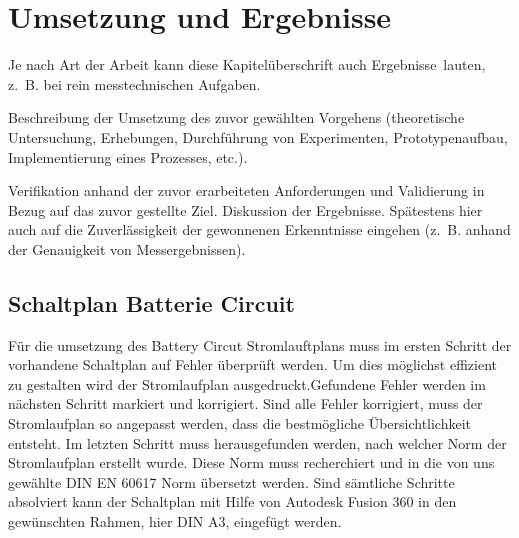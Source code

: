 \chapter{Umsetzung und Ergebnisse}
\label{cha:umsetzung}

Je nach Art der Arbeit kann diese Kapitelüberschrift auch \glqq Ergebnisse\grqq~lauten, z.~B. bei rein messtechnischen Aufgaben.

Beschreibung der Umsetzung des zuvor gewählten Vorgehens (theoretische Untersuchung, Erhebungen, Durchführung von Experimenten, Prototypenaufbau, Implementierung eines Prozesses, etc.).

Verifikation anhand der zuvor erarbeiteten Anforderungen und Validierung in Bezug auf das zuvor gestellte Ziel. Diskussion der Ergebnisse. Spätestens hier auch auf die Zuverlässigkeit der gewonnenen Erkenntnisse eingehen (z.~B. anhand der Genauigkeit von Messergebnissen).

%

%

%

\section*{Schaltplan Batterie Circuit}
Für die umsetzung des Battery Circut Stromlauftplans muss im ersten Schritt der vorhandene Schaltplan auf Fehler überprüft werden. Um dies möglichst effizient zu gestalten wird der Stromlaufplan ausgedruckt.Gefundene Fehler werden im nächsten Schritt markiert und korrigiert. Sind alle Fehler korrigiert, muss der Stromlaufplan so angepasst werden, dass die bestmögliche Übersichtlichkeit entsteht. Im letzten Schritt muss herausgefunden werden, nach welcher Norm der Stromlaufplan erstellt wurde. Diese Norm muss recherchiert und in die von uns gewählte DIN EN 60617 Norm \glqq übersetzt\grqq {} werden. Sind sämtliche Schritte absolviert kann der Schaltplan mit Hilfe von Autodesk Fusion 360 in den gewünschten Rahmen, hier DIN A3, eingefügt werden.
 

\addtocounter{page}{1} 
